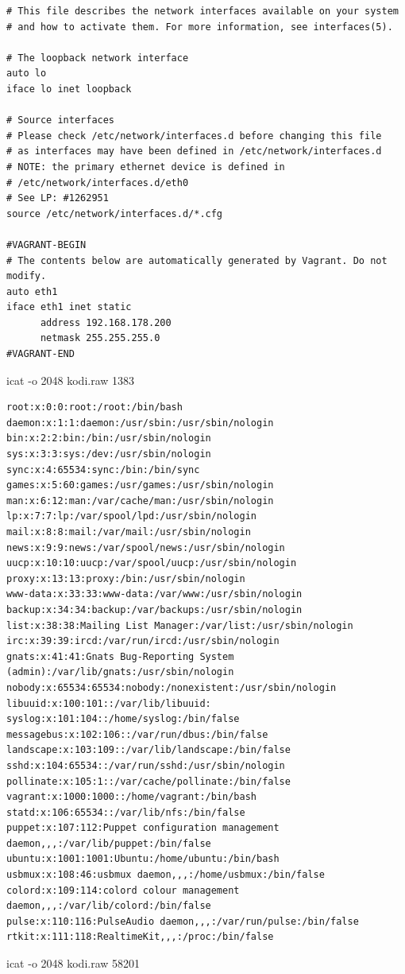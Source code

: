 \begin{cmd}[H]
\begin{verbatim}
# This file describes the network interfaces available on your system
# and how to activate them. For more information, see interfaces(5).

# The loopback network interface
auto lo
iface lo inet loopback

# Source interfaces
# Please check /etc/network/interfaces.d before changing this file
# as interfaces may have been defined in /etc/network/interfaces.d
# NOTE: the primary ethernet device is defined in
# /etc/network/interfaces.d/eth0
# See LP: #1262951
source /etc/network/interfaces.d/*.cfg

#VAGRANT-BEGIN
# The contents below are automatically generated by Vagrant. Do not modify.
auto eth1
iface eth1 inet static
      address 192.168.178.200
      netmask 255.255.255.0
#VAGRANT-END
\end{verbatim}
\caption{icat -o 2048 kodi.raw 1383}
\label{cmd:kodi-interfaces}
\end{cmd}

\begin{cmd}[H]
\begin{verbatim}
root:x:0:0:root:/root:/bin/bash
daemon:x:1:1:daemon:/usr/sbin:/usr/sbin/nologin
bin:x:2:2:bin:/bin:/usr/sbin/nologin
sys:x:3:3:sys:/dev:/usr/sbin/nologin
sync:x:4:65534:sync:/bin:/bin/sync
games:x:5:60:games:/usr/games:/usr/sbin/nologin
man:x:6:12:man:/var/cache/man:/usr/sbin/nologin
lp:x:7:7:lp:/var/spool/lpd:/usr/sbin/nologin
mail:x:8:8:mail:/var/mail:/usr/sbin/nologin
news:x:9:9:news:/var/spool/news:/usr/sbin/nologin
uucp:x:10:10:uucp:/var/spool/uucp:/usr/sbin/nologin
proxy:x:13:13:proxy:/bin:/usr/sbin/nologin
www-data:x:33:33:www-data:/var/www:/usr/sbin/nologin
backup:x:34:34:backup:/var/backups:/usr/sbin/nologin
list:x:38:38:Mailing List Manager:/var/list:/usr/sbin/nologin
irc:x:39:39:ircd:/var/run/ircd:/usr/sbin/nologin
gnats:x:41:41:Gnats Bug-Reporting System (admin):/var/lib/gnats:/usr/sbin/nologin
nobody:x:65534:65534:nobody:/nonexistent:/usr/sbin/nologin
libuuid:x:100:101::/var/lib/libuuid:
syslog:x:101:104::/home/syslog:/bin/false
messagebus:x:102:106::/var/run/dbus:/bin/false
landscape:x:103:109::/var/lib/landscape:/bin/false
sshd:x:104:65534::/var/run/sshd:/usr/sbin/nologin
pollinate:x:105:1::/var/cache/pollinate:/bin/false
vagrant:x:1000:1000::/home/vagrant:/bin/bash
statd:x:106:65534::/var/lib/nfs:/bin/false
puppet:x:107:112:Puppet configuration management daemon,,,:/var/lib/puppet:/bin/false
ubuntu:x:1001:1001:Ubuntu:/home/ubuntu:/bin/bash
usbmux:x:108:46:usbmux daemon,,,:/home/usbmux:/bin/false
colord:x:109:114:colord colour management daemon,,,:/var/lib/colord:/bin/false
pulse:x:110:116:PulseAudio daemon,,,:/var/run/pulse:/bin/false
rtkit:x:111:118:RealtimeKit,,,:/proc:/bin/false
\end{verbatim}
\caption{icat -o 2048 kodi.raw 58201}
\label{cmd:kodi-passwd}
\end{cmd}

